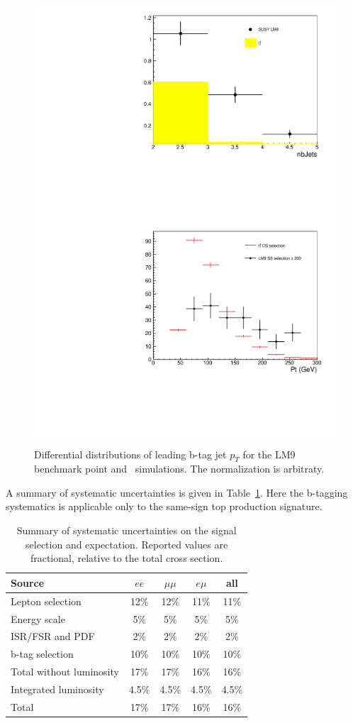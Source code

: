 \begin{figure}[htb]
\begin{center}
\includegraphics[width=0.48\linewidth, height=0.36\linewidth]{figs/lm9.pdf}
\includegraphics[width=0.6\linewidth, height=0.36\linewidth]{figs/bjetleading.pdf}
\caption{ Differential distributions of leading b-tag jet $p_T$ for the 
LM9 benchmark point and \ttbar\ simulations.
The normalization is arbitraty.\label{fig:lm9ttbar}}
\end{center}
\end{figure}


A summary of systematic uncertainties is given in Table~\ref{tab:systSumm}.
Here the b-tagging systematics is applicable only to the same-sign top production signature.

\begin{table}[h]
\begin{center}
\caption{\small\label{tab:systSumm}Summary of systematic uncertainties on the signal selection and
expectation. 
Reported values are fractional, relative to the total cross section.}
\begin{tabular}{lcccc}\hline
Source 					& $ee$		& $\mu\mu$		& $e\mu$	& all \\ \hline
Lepton selection			& 12\%		& 12\%			& 11\%		& 11\% \\
Energy scale				& 5\%		& 5\%			& 5\%		& 5\% \\
ISR/FSR and PDF				& 2\%		& 2\%			& 2\%		& 2\% 	\\
b-tag selection                         & 10\%          & 10\%                  & 10\%          & 10\% \\
Total without luminosity		& 17\%		& 17\%			& 16\%		& 16\%\\ \hline
Integrated luminosity			& 4.5\%		& 4.5\%			& 4.5\%		& 4.5\%	\\ \hline
Total 					& 17\%	 	& 17\%	 		& 16\% 		& 16\% \\
\hline
\end{tabular}
\end{center}
\end{table}

